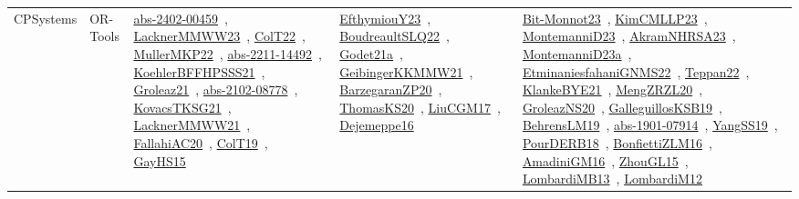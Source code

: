 {\begin{longtable}{lp{3cm}>{\raggedright\arraybackslash}p{6cm}>{\raggedright\arraybackslash}p{6cm}>{\raggedright\arraybackslash}p{8cm}}
CPSystems & OR-Tools & \href{../works/abs-2402-00459.pdf}{abs-2402-00459}~\cite{abs-2402-00459}, \href{../works/LacknerMMWW23.pdf}{LacknerMMWW23}~\cite{LacknerMMWW23}, \href{../works/ColT22.pdf}{ColT22}~\cite{ColT22}, \href{../works/MullerMKP22.pdf}{MullerMKP22}~\cite{MullerMKP22}, \href{../works/abs-2211-14492.pdf}{abs-2211-14492}~\cite{abs-2211-14492}, \href{../works/KoehlerBFFHPSSS21.pdf}{KoehlerBFFHPSSS21}~\cite{KoehlerBFFHPSSS21}, \href{../works/Groleaz21.pdf}{Groleaz21}~\cite{Groleaz21}, \href{../works/abs-2102-08778.pdf}{abs-2102-08778}~\cite{abs-2102-08778}, \href{../works/KovacsTKSG21.pdf}{KovacsTKSG21}~\cite{KovacsTKSG21}, \href{../works/LacknerMMWW21.pdf}{LacknerMMWW21}~\cite{LacknerMMWW21}, \href{../works/FallahiAC20.pdf}{FallahiAC20}~\cite{FallahiAC20}, \href{../works/ColT19.pdf}{ColT19}~\cite{ColT19}, \href{../works/GayHS15.pdf}{GayHS15}~\cite{GayHS15} & \href{../works/EfthymiouY23.pdf}{EfthymiouY23}~\cite{EfthymiouY23}, \href{../works/BoudreaultSLQ22.pdf}{BoudreaultSLQ22}~\cite{BoudreaultSLQ22}, \href{../works/Godet21a.pdf}{Godet21a}~\cite{Godet21a}, \href{../works/GeibingerKKMMW21.pdf}{GeibingerKKMMW21}~\cite{GeibingerKKMMW21}, \href{../works/BarzegaranZP20.pdf}{BarzegaranZP20}~\cite{BarzegaranZP20}, \href{../works/ThomasKS20.pdf}{ThomasKS20}~\cite{ThomasKS20}, \href{../works/LiuCGM17.pdf}{LiuCGM17}~\cite{LiuCGM17}, \href{../works/Dejemeppe16.pdf}{Dejemeppe16}~\cite{Dejemeppe16} & \href{../works/Bit-Monnot23.pdf}{Bit-Monnot23}~\cite{Bit-Monnot23}, \href{../works/KimCMLLP23.pdf}{KimCMLLP23}~\cite{KimCMLLP23}, \href{../works/MontemanniD23.pdf}{MontemanniD23}~\cite{MontemanniD23}, \href{../works/AkramNHRSA23.pdf}{AkramNHRSA23}~\cite{AkramNHRSA23}, \href{../works/MontemanniD23a.pdf}{MontemanniD23a}~\cite{MontemanniD23a}, \href{../works/EtminaniesfahaniGNMS22.pdf}{EtminaniesfahaniGNMS22}~\cite{EtminaniesfahaniGNMS22}, \href{../works/Teppan22.pdf}{Teppan22}~\cite{Teppan22}, \href{../works/KlankeBYE21.pdf}{KlankeBYE21}~\cite{KlankeBYE21}, \href{../works/MengZRZL20.pdf}{MengZRZL20}~\cite{MengZRZL20}, \href{../works/GroleazNS20.pdf}{GroleazNS20}~\cite{GroleazNS20}, \href{../works/GalleguillosKSB19.pdf}{GalleguillosKSB19}~\cite{GalleguillosKSB19}, \href{../works/BehrensLM19.pdf}{BehrensLM19}~\cite{BehrensLM19}, \href{../works/abs-1901-07914.pdf}{abs-1901-07914}~\cite{abs-1901-07914}, \href{../works/YangSS19.pdf}{YangSS19}~\cite{YangSS19}, \href{../works/PourDERB18.pdf}{PourDERB18}~\cite{PourDERB18}, \href{../works/BonfiettiZLM16.pdf}{BonfiettiZLM16}~\cite{BonfiettiZLM16}, \href{../works/AmadiniGM16.pdf}{AmadiniGM16}~\cite{AmadiniGM16}, \href{../works/ZhouGL15.pdf}{ZhouGL15}~\cite{ZhouGL15}, \href{../works/LombardiMB13.pdf}{LombardiMB13}~\cite{LombardiMB13}, \href{../works/LombardiM12.pdf}{LombardiM12}~\cite{LombardiM12}\\

\end{longtable}}
